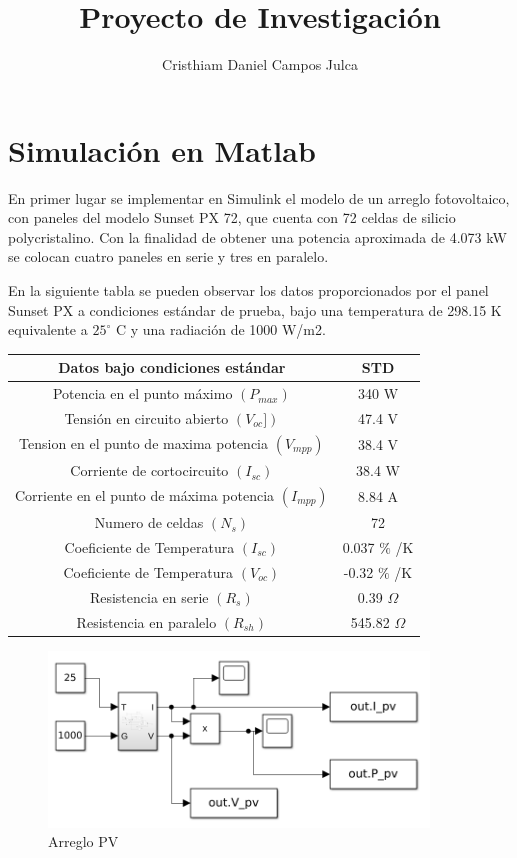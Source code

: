 \documentclass[a4paper,12pt]{article}
\title{Proyecto de Investigación}
\author{Cristhiam Daniel Campos Julca}
\begin{document}
 
	\maketitle 
	
	\section{Simulación en Matlab}
	
	En primer lugar se implementar en Simulink el modelo de un arreglo fotovoltaico, con paneles del modelo Sunset PX 72, que cuenta con 72 celdas de silicio polycristalino. Con la finalidad de obtener una potencia aproximada de 4.073 kW se colocan cuatro paneles en serie y tres en paralelo. 
	
	En la siguiente tabla se pueden observar los datos proporcionados por el panel Sunset PX a condiciones estándar de prueba, bajo una temperatura de	298.15 K equivalente a $25^{\circ}$ C y una radiación de 1000 W/m2. \newline\\
	
	
	\begin{tabular}{| c | c |}
		\hline
		\textbf{Datos bajo condiciones estándar} & \textbf{STD} \\ \hline
		Potencia en el punto máximo $(P_{max})$  & 340 W \\ \hline
		Tensión en circuito abierto $(V_{oc}])$ & 47.4 V \\ \hline
		Tension en el punto de maxima potencia $(V_{mpp})$ & 38.4 V \\ \hline
		Corriente de cortocircuito $ (I_{sc})$ & 38.4 W \\ \hline
		Corriente en el punto de máxima potencia $(I_{mpp})$ & 8.84 A \\ \hline
		Numero de celdas $(N_s)$ & 72 \\ \hline
		Coeficiente de Temperatura $(I_{sc})$ & 0.037 $\%$ /K \\ \hline
		Coeficiente de Temperatura $(V_{oc})$ & -0.32 $\%$ /K \\ \hline
		Resistencia en serie $(R_s)$ & 0.39 $\Omega$\\ \hline
		Resistencia en paralelo $(R_{sh})$ & 545.82 $\Omega$ \\ \hline
	\end{tabular} 
	
	\begin{figure}[htb]
		\centering
		\includegraphics[width=0.9\textwidth]{./imagenes/simulink1.png}
		\caption{Arreglo PV}
	\end{figure} 
\end{document}
